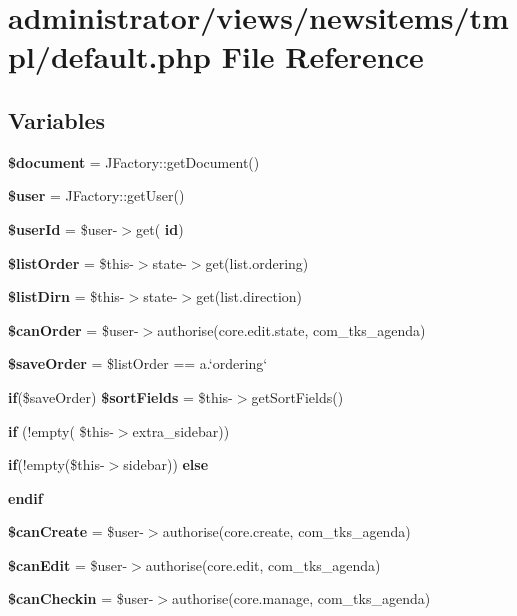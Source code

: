 \section{administrator/views/newsitems/tmpl/default.php File Reference}
\label{administrator_2views_2newsitems_2tmpl_2default_8php}
\subsection*{Variables}
\begin{DoxyCompactItemize}
\item 
\textbf{ \$document} = J\+Factory\+::get\+Document()
\item 
\textbf{ \$user} = J\+Factory\+::get\+User()
\item 
\textbf{ \$user\+Id} = \$user-\/$>$get(\textquotesingle{}\textbf{ id}\textquotesingle{})
\item 
\textbf{ \$list\+Order} = \$this-\/$>$state-\/$>$get(\textquotesingle{}list.\+ordering\textquotesingle{})
\item 
\textbf{ \$list\+Dirn} = \$this-\/$>$state-\/$>$get(\textquotesingle{}list.\+direction\textquotesingle{})
\item 
\textbf{ \$can\+Order} = \$user-\/$>$authorise(\textquotesingle{}core.\+edit.\+state\textquotesingle{}, \textquotesingle{}com\+\_\+tks\+\_\+agenda\textquotesingle{})
\item 
\textbf{ \$save\+Order} = \$list\+Order == \textquotesingle{}a.`ordering`\textquotesingle{}
\item 
\textbf{ if}(\$save\+Order) \textbf{ \$sort\+Fields} = \$this-\/$>$get\+Sort\+Fields()
\item 
\textbf{ if} (!empty( \$this-\/$>$extra\+\_\+sidebar))
\item 
\textbf{ if}(!empty(\$this-\/$>$sidebar)) \textbf{ else}
\item 
\textbf{ endif}
\item 
\textbf{ \$can\+Create} = \$user-\/$>$authorise(\textquotesingle{}core.\+create\textquotesingle{}, \textquotesingle{}com\+\_\+tks\+\_\+agenda\textquotesingle{})
\item 
\textbf{ \$can\+Edit} = \$user-\/$>$authorise(\textquotesingle{}core.\+edit\textquotesingle{}, \textquotesingle{}com\+\_\+tks\+\_\+agenda\textquotesingle{})
\item 
\textbf{ \$can\+Checkin} = \$user-\/$>$authorise(\textquotesingle{}core.\+manage\textquotesingle{}, \textquotesingle{}com\+\_\+tks\+\_\+agenda\textquotesingle{})

\end{DoxyCompactItemize}
